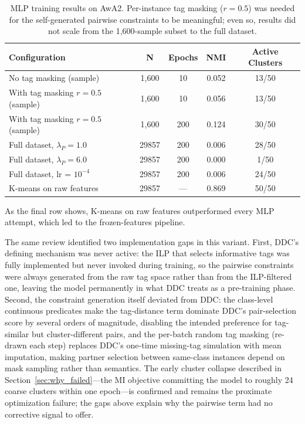 \begin{table}[H]
    \centering
    \caption{MLP training results on AwA2. Per-instance tag masking ($r = 0.5$) was needed for the self-generated pairwise constraints to be meaningful; even so, results did not scale from the 1,600-sample subset to the full dataset.}
    \label{tab:mlp_results}
    \begin{tabular}{lcccc}
        \toprule
        \textbf{Configuration} & \textbf{N} & \textbf{Epochs} & \textbf{NMI} & \textbf{Active Clusters} \\
        \midrule
        No tag masking (sample) & 1,600 & 10 & 0.052 & 13/50 \\
        With tag masking $r=0.5$ (sample) & 1,600 & 10 & 0.056 & 13/50 \\
        With tag masking $r=0.5$ (sample) & 1,600 & 200 & 0.124 & 30/50 \\
        Full dataset, $\lambda_P = 1.0$ & 29857 & 200 & 0.006 & 28/50 \\
        Full dataset, $\lambda_P = 6.0$ & 29857 & 200 & 0.000 & 1/50 \\
        Full dataset, lr = $10^{-4}$ & 29857 & 200 & 0.006 & 24/50 \\
        \midrule
        K-means on raw features & 29857 & --- & 0.869 & 50/50 \\
        \bottomrule
    \end{tabular}
\end{table}

As the final row shows, K-means on raw features outperformed every MLP attempt, which led to the frozen-features pipeline.

The same review identified two implementation gaps in this variant. First, DDC's defining mechanism was never active: the ILP that selects informative tags was fully implemented but never invoked during training, so the pairwise constraints were always generated from the raw tag space rather than from the ILP-filtered one, leaving the model permanently in what DDC treats as a pre-training phase. Second, the constraint generation itself deviated from DDC: the class-level continuous predicates make the tag-distance term dominate DDC's pair-selection score by several orders of magnitude, disabling the intended preference for tag-similar but cluster-different pairs, and the per-batch random tag masking (re-drawn each step) replaces DDC's one-time missing-tag simulation with mean imputation, making partner selection between same-class instances depend on mask sampling rather than semantics. The early cluster collapse described in Section~\ref{sec:why_failed}---the MI objective committing the model to roughly 24 coarse clusters within one epoch---is confirmed and remains the proximate optimization failure; the gaps above explain why the pairwise term had no corrective signal to offer.

